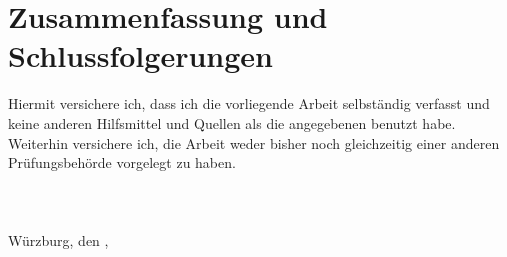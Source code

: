 \documentclass[a4paper]{scrreprt}
\theoremstyle{definition}
\begin{document}
\chapter{Zusammenfassung und Schlussfolgerungen}









\newpage

Hiermit versichere ich, dass ich die vorliegende Arbeit selbständig verfasst und keine
anderen Hilfsmittel und Quellen als die angegebenen benutzt habe. Weiterhin versichere
ich, die Arbeit weder bisher noch gleichzeitig einer anderen Prüfungsbehörde vorgelegt
zu haben.
\\ \\ \\ \\
Würzburg, den \makebox[3cm]{\hrulefill},  \hspace{.5cm} \makebox[7cm]{\hrulefill}\\
\end{document}
